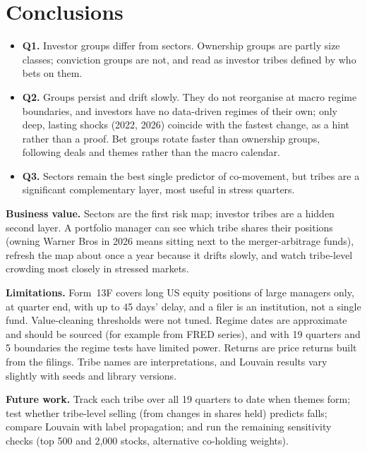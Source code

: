 \documentclass[10pt,a4paper]{article}
\begin{document}
\section{Conclusions}
\begin{itemize}
  \item \textbf{Q1.} Investor groups differ from sectors. Ownership groups are partly size classes; conviction groups are not, and read as investor tribes defined by who bets on them.
  \item \textbf{Q2.} Groups persist and drift slowly. They do not reorganise at macro regime boundaries, and investors have no data-driven regimes of their own; only deep, lasting shocks (2022, 2026) coincide with the fastest change, as a hint rather than a proof. Bet groups rotate faster than ownership groups, following deals and themes rather than the macro calendar.
  \item \textbf{Q3.} Sectors remain the best single predictor of co-movement, but tribes are a significant complementary layer, most useful in stress quarters.
\end{itemize}
\noindent\textbf{Business value.} Sectors are the first risk map; investor tribes are a hidden second layer. A portfolio manager can see which tribe shares their positions (owning Warner Bros in 2026 means sitting next to the merger-arbitrage funds), refresh the map about once a year because it drifts slowly, and watch tribe-level crowding most closely in stressed markets.

\noindent\textbf{Limitations.} Form~13F covers long US equity positions of large managers only, at quarter end, with up to 45 days' delay, and a filer is an institution, not a single fund. Value-cleaning thresholds were not tuned. Regime dates are approximate and should be sourced (for example from FRED series), and with 19 quarters and 5 boundaries the regime tests have limited power. Returns are price returns built from the filings. Tribe names are interpretations, and Louvain results vary slightly with seeds and library versions.

\noindent\textbf{Future work.} Track each tribe over all 19 quarters to date when themes form; test whether tribe-level selling (from changes in shares held) predicts falls; compare Louvain with label propagation; and run the remaining sensitivity checks (top 500 and 2,000 stocks, alternative co-holding weights).



\end{document}
